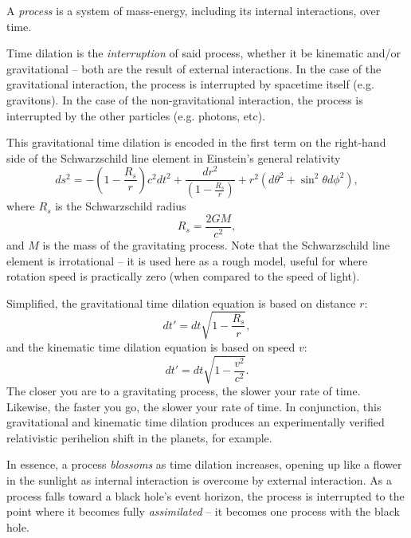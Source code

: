 \documentclass[12pt]{article}
\begin{document}
A {\textit{process}} is a system of mass-energy, including its internal interactions, over time.

Time dilation is the {\textit{interruption}} of said process, whether it be kinematic and/or gravitational -- both are the result of external interactions.
In the case of the gravitational interaction, the process is interrupted by spacetime itself (e.g. gravitons).
In the case of the non-gravitational interaction, the process is interrupted by the other particles (e.g. photons, etc).

This gravitational time dilation \cite{misner} is encoded in the first term on the right-hand side of the Schwarzschild line element in Einstein's general relativity
\begin{equation}
ds^2 = -\left( 1 - \frac{R_s}{r} \right) c^2 dt^2 + \frac{dr^2}{\left( 1 - \frac{R_s}{r} \right)} + r^2 (d\theta^2 + \sin^2 \theta d\phi^2),
\end{equation}
where $R_s$ is the Schwarzschild radius
\begin{equation}
R_s = \frac{2GM}{c^2},
\end{equation}
and $M$ is the mass of the gravitating process.
Note that the Schwarzschild line element is irrotational -- it is used here as a rough model, useful for where rotation speed is practically zero (when compared to the speed of light).

Simplified, the gravitational time dilation equation is based on distance $r$:
\begin{equation}
dt' = dt \sqrt{1 - \frac{R_s}{r}},
\end{equation}
and the kinematic time dilation equation is based on speed $v$:
\begin{equation}
dt' = dt \sqrt{1 - \frac{v^2}{c^2}}.
\end{equation}
The closer you are to a gravitating process, the slower your rate of time.
Likewise, the faster you go, the slower your rate of time.
In conjunction, this gravitational and kinematic time dilation produces an experimentally verified relativistic perihelion shift in the planets, for example.

In essence, a process {\textit{blossoms}} as time dilation increases, opening up like a flower in the sunlight as internal interaction is overcome by external interaction.
As a process falls toward a black hole's event horizon, the process is interrupted to the point where it becomes fully {\textit{assimilated}} -- it becomes one process with the black hole.
\end{document}
